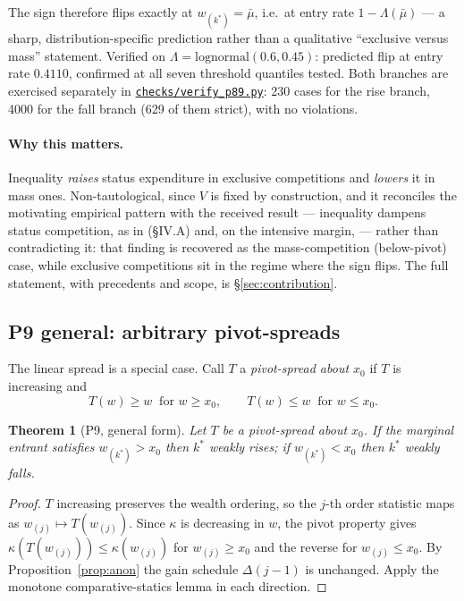 \documentclass[11pt]{article}
\newtheorem{theorem}{Theorem}
\newcommand{\file}[1]{\href{run:#1}{\texttt{#1}}}
\begin{document}
The sign therefore flips exactly at $w_{(k^*)}=\bar\mu$, i.e.\ at entry
rate $1-\Lambda(\bar\mu)$ --- a sharp, distribution-specific prediction
rather than a qualitative ``exclusive versus mass'' statement. Verified on
$\Lambda=\text{lognormal}(0.6,0.45)$: predicted flip at entry rate
$0.4110$, confirmed at all seven threshold quantiles tested. Both branches
are exercised separately in
\file{checks/verify\_p89.py}: 230 cases for the rise branch, 4000 for the
fall branch (629 of them strict), with no violations.

\paragraph{Why this matters.} Inequality \emph{raises} status
expenditure in exclusive competitions and \emph{lowers} it in mass
ones. Non-tautological, since $V$ is fixed by construction, and it
reconciles the motivating empirical pattern with the received result ---
inequality dampens status competition, as in
\citet{ColeMailathPostlewaite1992} (\S IV.A) and, on the intensive margin,
\citet{HopkinsKornienko2004,HopkinsKornienko2010} --- rather than
contradicting it: that finding is recovered as the mass-competition
(below-pivot) case, while exclusive competitions sit in the regime where the
sign flips. The full statement, with precedents and scope, is
\S\ref{sec:contribution}.

\subsection{P9 general: arbitrary pivot-spreads}
\label{prop:P9gen}

The linear spread is a special case. Call $T$ a \emph{pivot-spread about
$x_0$} if $T$ is increasing and
\[
  T(w)\ge w \ \text{ for } w\ge x_0, \qquad
  T(w)\le w \ \text{ for } w\le x_0 .
\]

\begin{theorem}[P9, general form]
\label{thm:P9gen}
Let $T$ be a pivot-spread about $x_0$. If the marginal entrant satisfies
$w_{(k^*)}>x_0$ then $k^*$ weakly rises; if $w_{(k^*)}<x_0$ then $k^*$
weakly falls.
\end{theorem}
\begin{proof}
$T$ increasing preserves the wealth ordering, so the $j$-th order
statistic maps as $w_{(j)}\mapsto T(w_{(j)})$. Since $\kappa$ is
decreasing in $w$, the pivot property gives
$\kappa(T(w_{(j)}))\le\kappa(w_{(j)})$ for $w_{(j)}\ge x_0$ and the
reverse for $w_{(j)}\le x_0$. By Proposition~\ref{prop:anon} the gain
schedule $\Delta(j-1)$ is unchanged. Apply the monotone
comparative-statics lemma in each direction.
\end{proof}
\end{document}
